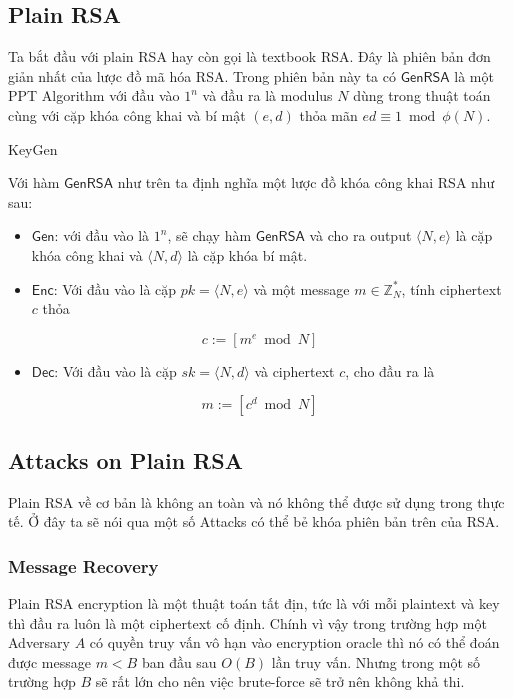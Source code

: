 \documentclass[12pt]{article}
\begin{document}
\subsection{Plain RSA}
Ta bắt đầu với plain RSA hay còn gọi là textbook RSA. Đây là phiên bản đơn giản nhất của lược đồ mã hóa RSA. Trong phiên bản này ta có $\displaystyle \mathsf{GenRSA}$ là một PPT Algorithm với đầu vào $\displaystyle 1^{n}$ và đầu ra là modulus $\displaystyle N$ dùng trong thuật toán cùng với cặp khóa công khai và bí mật $\displaystyle ( e,d)$ thỏa mãn $\displaystyle ed\equiv 1\bmod \phi ( N)$. 


\begin{constructionbox}{KeyGen}


Với hàm $\displaystyle \mathsf{GenRSA}$ như trên ta định nghĩa một lược đồ khóa công khai RSA như sau: 
\begin{itemize}
\item $\displaystyle \mathsf{Gen}$: với đầu vào là $\displaystyle 1^{n}$, sẽ chạy hàm $\displaystyle \mathsf{GenRSA}$ và cho ra output $\displaystyle \langle N,e\rangle $ là cặp khóa công khai và $\displaystyle \langle N,d\rangle $ là cặp khóa bí mật. 
\item $\displaystyle \mathsf{Enc}$: Với đầu vào là cặp $\displaystyle pk=\langle N,e\rangle $ và một message $\displaystyle m\in \mathbb{Z}_{N}^{*}$, tính ciphertext $\displaystyle c$ thỏa
\end{itemize}
\begin{equation*}
c:=\left[ m^{e}\bmod N\right]
\end{equation*}
\begin{itemize}
\item $\displaystyle \mathsf{Dec}$: Với đầu vào là cặp $\displaystyle sk=\langle N,d\rangle $ và ciphertext $\displaystyle c$, cho đầu ra là 
\end{itemize}
\begin{equation*}
m:=\left[ c^{d}\bmod N\right]
\end{equation*} 
\end{constructionbox}


\subsection{Attacks on Plain RSA}

Plain RSA về cơ bản là không an toàn và nó không thể được sử dụng trong thực tế. Ở đây ta sẽ nói qua một số Attacks có thể bẻ khóa phiên bản trên của RSA.


\subsubsection{Message Recovery}
Plain RSA encryption là một thuật toán tất địn, tức là với mỗi plaintext và key thì đầu ra luôn là một ciphertext cố định. Chính vì vậy trong trường hợp một Adversary $\displaystyle A$ có quyền truy vấn vô hạn vào encryption oracle thì nó có thể đoán được message $\displaystyle m< B$ ban đầu sau $\displaystyle O( B)$ lần truy vấn. Nhưng trong một số trường hợp $\displaystyle B$ sẽ rất lớn cho nên việc brute-force sẽ trở nên không khả thi. 
\end{document}
